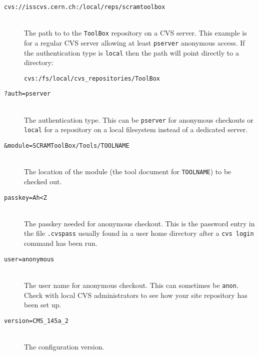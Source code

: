 \begin{description}
\item[\texttt{cvs://isscvs.cern.ch:/local/reps/scramtoolbox}]\mbox{}\\
  The path to to the \texttt{ToolBox} repository on a CVS server. This
  example is for a regular CVS server allowing at least \texttt{pserver}
  anonymous access. If the authentication type is \texttt{local} then
  the path will point directly to a directory:\mbox{}\\
\begin{center}
\small{
\begin{verbatim}
cvs:/fs/local/cvs_repositories/ToolBox
\end{verbatim}}\normalsize
\vspace{-5mm}
\end{center}
\item[\texttt{{?}auth=pserver}]\mbox{}\\
  The authentication type. This can be \texttt{pserver} for anonymous
  checkouts or \texttt{local} for a repository on a local filesystem
  instead of a dedicated server.
\item[\texttt{\&module=SCRAMToolBox/Tools/TOOLNAME}]\mbox{}\\
  The location of the module (the tool document for \texttt{TOOLNAME}) 
  to be checked out.
\item[\texttt{passkey=Ah<Z}]\mbox{}\\
  The passkey needed for anonymous checkout. This is the password entry
  in the file \texttt{.cvspass} usually found in a user home directory
  after a \texttt{cvs login} command has been run.
\item[\texttt{user=anonymous}]\mbox{}\\
  The user name for anonymous checkout. This can sometimes be
  \texttt{anon}. Check with local CVS administrators to see how your
  site repository has been set up.
\item[\texttt{version=CMS\_145a\_2}]\mbox{}\\
  The configuration version.
\end{description}


